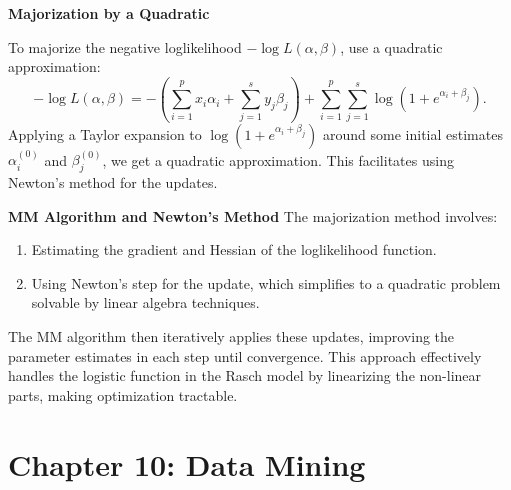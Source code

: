 \documentclass[8pt]{article}
\begin{document}
\textbf{Majorization by a Quadratic}

To majorize the negative loglikelihood \(-\log L(\alpha, \beta)\), use a quadratic approximation:
\[
-\log L(\alpha, \beta) = -\left(\sum_{i=1}^p x_i \alpha_i + \sum_{j=1}^s y_j \beta_j\right) + \sum_{i=1}^p \sum_{j=1}^s \log(1 + e^{\alpha_i + \beta_j}).
\]
Applying a Taylor expansion to \(\log(1 + e^{\alpha_i + \beta_j})\) around some initial estimates \(\alpha_i^{(0)}\) and \(\beta_j^{(0)}\), we get a quadratic approximation. This facilitates using Newton's method for the updates.

\textbf{MM Algorithm and Newton's Method}
The majorization method involves:
\begin{enumerate}
    \item Estimating the gradient and Hessian of the loglikelihood function.
    \item Using Newton’s step for the update, which simplifies to a quadratic problem solvable by linear algebra techniques.
\end{enumerate}

The MM algorithm then iteratively applies these updates, improving the parameter estimates in each step until convergence. This approach effectively handles the logistic function in the Rasch model by linearizing the non-linear parts, making optimization tractable.

\newpage
\section*{Chapter 10: Data Mining}
\end{document}

